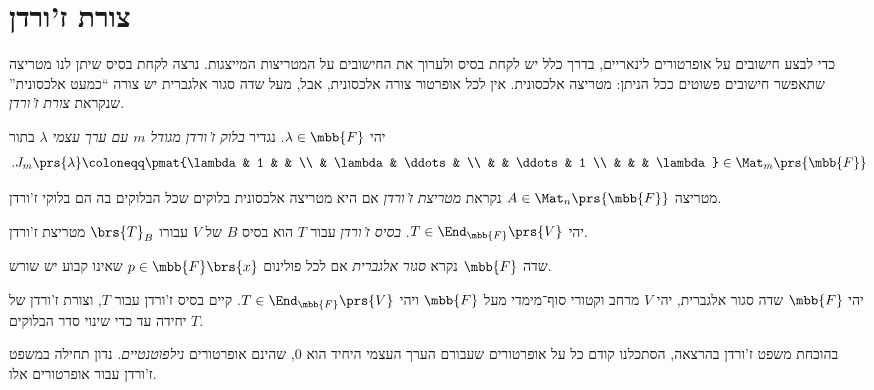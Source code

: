 \documentclass[a4paper,10pt,twoside,openany]{book}
\begin{document}
\vfill
\hspace{0pt}
\pagebreak

\chapter{צורת ז'ורדן}

כדי לבצע חישובים על אופרטורים לינאריים, בדרך כלל יש לקחת בסיס ולערוך את החישובים על המטריצות המייצגות.
נרצה לקחת בסיס שיתן לנו מטריצה שתאפשר חישובים פשוטים ככל הניתן: מטריצה אלכסונית. אין לכל אופרטור צורה אלכסונית, אבל, מעל שדה סגור אלגברית יש צורה
``כמעט אלכסונית'' שנקראת
\emph{צורת ז'ורדן}.

\begin{definition}
יהי
$\lambda \in \mbb{F}$.
נגדיר
\emph{בלוק ז'ורדן מגודל
$m$
עם ערך עצמי
$\lambda$}
בתור
\begin{align*}
\text{.} J_m\prs{\lambda} \coloneqq \pmat{\lambda & 1 & & \\ & \lambda & \ddots & \\ & & \ddots & 1 \\ & & & \lambda} \in \Mat_m\prs{\mbb{F}}
\end{align*}
\end{definition}

\begin{definition}
מטריצה
$A \in \Mat_n\prs{\mbb{F}}$
נקראת
\emph{מטריצת ז'ורדן}
אם היא מטריצה אלכסונית בלוקים שכל הבלוקים בה הם בלוקי ז'ורדן.
\end{definition}

\begin{definition}
יהי
$T \in \End_{\mbb{F}}\prs{V}$.
\emph{בסיס ז'ורדן}
עבור
$T$
הוא בסיס
$B$
של
$V$
עבורו
$\brs{T}_B$
מטריצת ז'ורדן.
\end{definition}

\begin{definition}
שדה
$\mbb{F}$
נקרא
\emph{סגור אלגברית}
אם לכל פולינום
$p \in \mbb{F}\brs{x}$
שאינו קבוע יש שורש.
\end{definition}

\begin{theorem}
יהי
$\mbb{F}$
שדה סגור אלגברית, יהי
$V$
מרחב וקטורי סוף־מימדי מעל
$\mbb{F}$
ויהי
$T \in \End_{\mbb{F}}\prs{V}$.
קיים בסיס ז'ורדן עבור
$T$,
וצורת ז'ורדן של
$T$
יחידה עד כדי שינוי סדר הבלוקים.
\end{theorem}

בהוכחת משפט ז'ורדן בהרצאה, הסתכלנו קודם כל על אופרטורים שעבורם הערך העצמי היחיד הוא
$0$,
שהינם אופרטורים
\emph{נילפוטנטיים}.
נדון תחילה במשפט ז'ורדן עבור אופרטורים אלו.
\end{document}
